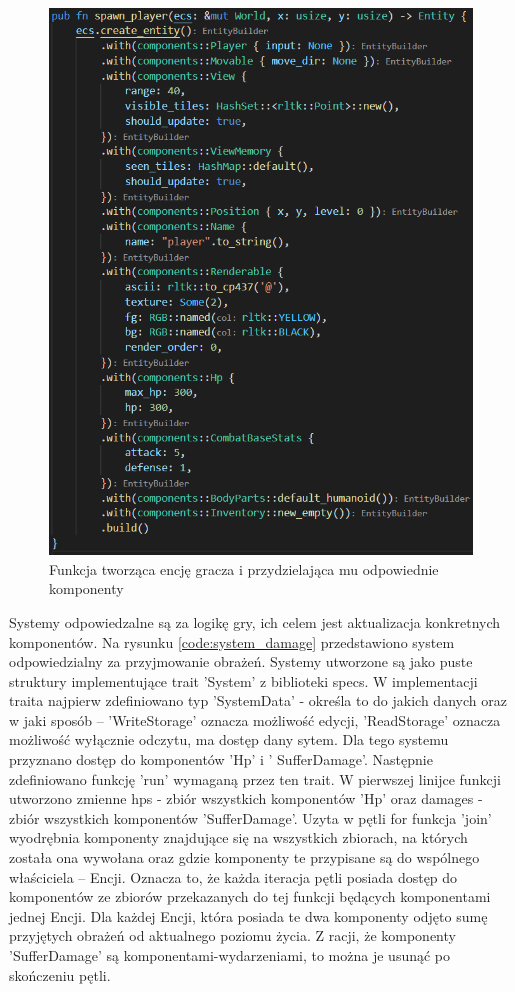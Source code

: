 \documentclass[12pt,twoside]{article}
\begin{document}
\FloatBarrier
\begin{figure}[h]
	\centering
	\includegraphics[width=12cm]{images/code/spawn_player.png}
	\caption{Funkcja tworząca encję gracza i przydzielająca mu odpowiednie komponenty}
	\label{code:spawn_player}
\end{figure}
\FloatBarrier


Systemy odpowiedzalne są za logikę gry, ich celem jest aktualizacja konkretnych komponentów. Na rysunku \ref{code:system_damage} przedstawiono system odpowiedzialny za przyjmowanie obrażeń. Systemy utworzone są jako puste struktury implementujące trait 'System' z biblioteki specs. W implementacji traita najpierw zdefiniowano typ 'SystemData' - określa to do jakich danych oraz w jaki sposób -- 'WriteStorage' oznacza możliwość edycji, 'ReadStorage' oznacza możliwość wyłącznie odczytu, ma dostęp dany sytem. Dla tego systemu przyznano dostęp do komponentów 'Hp' i ' SufferDamage'. Następnie zdefiniowano funkcję 'run' wymaganą przez ten trait. W pierwszej linijce funkcji utworzono zmienne hps - zbiór wszystkich komponentów 'Hp' oraz damages - zbiór wszystkich komponentów 'SufferDamage'. Uzyta w pętli for funkcja 'join' wyodrębnia komponenty znajdujące się na wszystkich zbiorach, na których została ona wywołana oraz gdzie komponenty te przypisane są do wspólnego właściciela -- Encji. Oznacza to, że każda iteracja pętli posiada dostęp do komponentów ze zbiorów przekazanych do tej funkcji będących komponentami jednej Encji. Dla każdej Encji, która posiada te dwa komponenty odjęto sumę przyjętych obrażeń od aktualnego poziomu życia. Z racji, że komponenty 'SufferDamage' są komponentami-wydarzeniami, to można je usunąć po skończeniu pętli.
\end{document}
